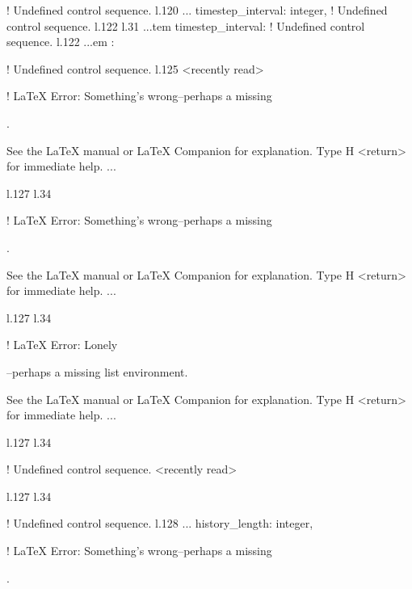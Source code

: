 {{{{{{! Undefined control sequence.
l.120 ...           {timestep\_interval}: \xmlDesc
                                                  {integer},
! Undefined control sequence.
l.122 l.31 ...tem \xmlNode
                          {timestep\_interval}: \xmlDesc
! Undefined control sequence.
l.122 ...em : \xmlDesc
                                                  
! Undefined control sequence.
l.125 <recently read> \xmlNode
                              

! LaTeX Error: Something's wrong--perhaps a missing \item.

See the LaTeX manual or LaTeX Companion for explanation.
Type  H <return>  for immediate help.
 ...                                              
                                                  
l.127 l.34     \item \xmlNode
                             

! LaTeX Error: Something's wrong--perhaps a missing \item.

See the LaTeX manual or LaTeX Companion for explanation.
Type  H <return>  for immediate help.
 ...                                              
                                                  
l.127 l.34     \item \xmlNode
                             

! LaTeX Error: Lonely \item--perhaps a missing list environment.

See the LaTeX manual or LaTeX Companion for explanation.
Type  H <return>  for immediate help.
 ...                                              
                                                  
l.127 l.34     \item \xmlNode
                             
! Undefined control sequence.
<recently read> \xmlNode 
                         
l.127 l.34     \item \xmlNode
                             
! Undefined control sequence.
l.128 ...              {history\_length}: \xmlDesc
                                                  {integer},

! LaTeX Error: Something's wrong--perhaps a missing \item.

}}}}}}
